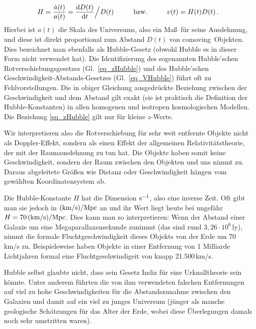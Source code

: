 \begin{enumerate}
\begin{equation}
\label{eq_VHubble}
                    H = \frac{\dot{a}(t)}{a(t)} = \frac{{\rm d}D(t)}{{\rm d}t} \Big/ D(t)  \hspace{1cm} {\rm bzw.} \hspace{1cm}
                              v(t) = H(t) D(t) \, .
\end{equation}    
Hierbei ist $a(t)$ die Skala des Universums, also ein Ma\ss\ f\"ur seine Ausdehnung, und diese ist direkt
proportional zum Abstand $D(t)$ von \glqq comoving\grqq\ Objekten. 
Dies bezeichnet man ebenfalls als Hubble-Gesetz (obwohl Hubble es in dieser Form nicht verwendet
hat). Die Identifizierung des sogenannten Hubble'schen Rotverschiebungsgesetzes (Gl.\ \ref{eq_zHubble}) und des
Hubble'schen Geschwindigkeit-Abstands-Gesetzes (Gl.\ \ref{eq_VHubble}) f\"uhrt oft zu Fehlvorstellungen.
Die in obiger Gleichung ausgedr\"uckte Beziehung zwischen der Geschwindigkeit und dem Abstand
gilt exakt (sie ist praktisch die Definition der Hubble-Konstanten) in allen homogenen und isotropen
kosmologischen Modellen. Die Beziehung \ref{eq_zHubble} gilt nur f\"ur kleine $z$-Werte.  
\end{enumerate} 

Wir interpretieren also die
Rotverschiebung f\"ur sehr weit entfernte Objekte nicht als Doppler-Effekt, sondern als einen Effekt
der allgemeinen Relativit\"atstheorie, der mit der Raumausdehnung zu tun hat. Die Objekte haben somit
keine Geschwindigkeit, sondern der Raum zwischen den Objekten und uns nimmt zu. Daraus abgeleitete
Gr\"o\ss en wie Distanz oder Geschwindigkeit h\"angen vom gew\"ahlten Koordinatensystem ab.

Die Hubble-Konstante $H$ 
hat die Dimension ${\rm s}^{-1}$, also eine inverse Zeit. Oft gibt man sie
jedoch in ${\rm (km/s)/Mpc}$ an und ihr Wert liegt heute bei ungef\"ahr $H=70\,{\rm (km/s)/Mpc}$.
Dies kann man so interpretieren: Wenn der Abstand einer Galaxie um eine Megaparallaxensekunde
zunimmt (das sind rund $3,26\cdot 10^6$\,ly), nimmt die formale Fluchtgeschwindigkeit dieses Objekts von der
Erde um $70$\,km/s zu. Beispielsweise haben Objekte in einer Entfernung von 1 Milliarde Lichtjahren formal eine
Fluchtgeschwindigeit von knapp 21.500\,km/s.  

Hubble selbst glaubte nicht, dass sein Gesetz Indiz f\"ur eine Urknalltheorie sein k\"onnte. Unter anderem
f\"uhrten die von ihm verwendeten falschen Entfernungen auf viel zu hohe Geschwindigkeiten f\"ur die Abstandszunahme
zwischen den Galaxien und damit auf ein viel zu junges Universum (j\"unger als manche geologische
Sch\"atzungen f\"ur das Alter der Erde, wobei diese \"Uberlegungen damals noch sehr umstritten waren). 

